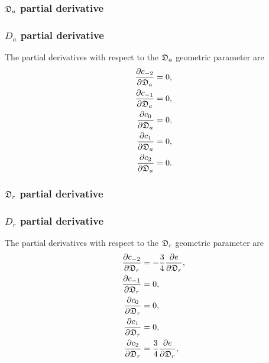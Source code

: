 \begin{latexonly}
    \subsubsection{$\mathfrak{D}_a$ partial derivative}
\end{latexonly}
\begin{htmlonly}
    \subsubsection{$D_a$ partial derivative}
\end{htmlonly}

The partial derivatives with respect to the $\mathfrak{D}_a$ geometric parameter are
\begin{subequations}
\begin{align}
    \frac{\partial c_{-2}}{\partial \mathfrak{D}_a} &= 0, \\
    \frac{\partial c_{-1}}{\partial \mathfrak{D}_a} &= 0, \\
    \frac{\partial c_{0}}{\partial \mathfrak{D}_a}  &= 0, \\
    \frac{\partial c_{1}}{\partial \mathfrak{D}_a}  &= 0, \\
    \frac{\partial c_{2}}{\partial \mathfrak{D}_a}  &= 0.
\end{align}
\end{subequations}


\begin{latexonly}
    \subsubsection{$\mathfrak{D}_r$ partial derivative}
\end{latexonly}
\begin{htmlonly}
    \subsubsection{$D_r$ partial derivative}
\end{htmlonly}

The partial derivatives with respect to the $\mathfrak{D}_r$ geometric parameter are
\begin{subequations}
\begin{align}
    \frac{\partial c_{-2}}{\partial \mathfrak{D}_r} &= -\frac{3}{4} \frac{\partial e}{\partial \mathfrak{D}_r}, \\
    \frac{\partial c_{-1}}{\partial \mathfrak{D}_r} &= 0, \\
    \frac{\partial c_{0}}{\partial \mathfrak{D}_r}  &= 0, \\
    \frac{\partial c_{1}}{\partial \mathfrak{D}_r}  &= 0, \\
    \frac{\partial c_{2}}{\partial \mathfrak{D}_r}  &= \frac{3}{4} \frac{\partial e}{\partial \mathfrak{D}_r},
\end{align}
\end{subequations}

